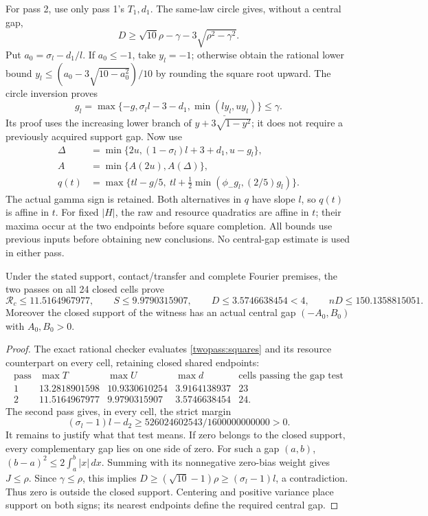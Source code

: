 For pass 2, use only pass 1's $T_1,d_1$. The same-law circle gives,
without a central gap,
\[
 D\ge\sqrt{10}\rho-\gamma-3\sqrt{\rho^2-\gamma^2}.
\]
Put $a_0=\sigma_l-d_1/l$. If $a_0\le-1$, take $y_l=-1$;
otherwise obtain the rational lower bound
$y_l\le(a_0-3\sqrt{10-a_0^2})/10$ by rounding the square root upward.
The circle inversion proves
\[
 g_l=\max\{-g,\sigma_l l-3-d_1,\underline{\min(ly_l,uy_l)}\}\le\gamma.
\]
Its proof uses the increasing lower branch of
$y+3\sqrt{1-y^2}$; it does not require a previously acquired support gap.
Now use
\begin{align*}
 \Delta&=\min\{2u,(1-\sigma_l)l+3+d_1,u-g_l\},\\
 A&=\min\{A(2u),A(\Delta)\},\\
 q(t)&=\max\{tl-g/5,\ tl+\tfrac12\min(\phi_-g_l,(2/5)g_l)\}.
\end{align*}
The actual gamma sign is retained. Both alternatives in $q$ have slope
$l$, so $q(t)$ is affine in $t$. For fixed $|H|$, the raw and resource
quadratics are affine in $t$; their maxima occur at the two endpoints
before square completion. All bounds use previous inputs before obtaining
new conclusions. No central-gap estimate is used in either pass.

\begin{theorem}\label{twopass:result}
Under the stated support, contact/transfer and complete Fourier premises,
the two passes on all 24 closed cells prove
\[
 \mathcal R_c\le11.5164967977,\qquad
 S\le9.9790315907,\qquad
 D\le3.5746638454<4,\qquad nD\le150.1358815051.
\]
Moreover the closed support of the witness has an actual central gap
$(-A_0,B_0)$ with $A_0,B_0>0$.
\end{theorem}
\begin{proof}
The exact rational checker evaluates \eqref{twopass:squares} and its
resource counterpart on every cell, retaining closed shared endpoints:
\[
\begin{array}{c|r|r|r|c}
 \text{pass}&\max T&\max U&\max d&\text{cells passing the gap test}\\\hline
 1&13.2818901598&10.9330610254&3.9164138937&23\\
 2&11.5164967977&9.9790315907&3.5746638454&24.
\end{array}
\]
The second pass gives, in every cell, the strict margin
\[
 (\sigma_l-1)l-d_2\ge
 526024602543/1600000000000>0.
\]
It remains to justify what that test means. If zero belongs to the
closed support, every complementary gap lies on one side of zero.
For such a gap $(a,b)$,
$(b-a)^2\le2\int_a^b|x|\,dx$.
Summing with its nonnegative zero-bias weight gives $J\le\rho$.
Since $\gamma\le\rho$, this implies
$D\ge(\sqrt{10}-1)\rho\ge(\sigma_l-1)l$, a contradiction.
Thus zero is outside the closed support. Centering and positive variance
place support on both signs; its nearest endpoints define the required
central gap.
\end{proof}

